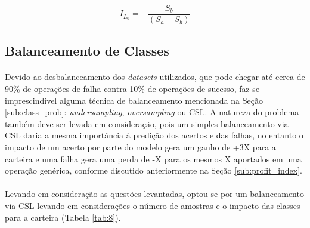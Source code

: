 \begin{equation} \label{eq:172}
    I_{L_0} = - \dfrac{S_b}{(S_a - S_b)}
\end{equation}



\FloatBarrier
\subsection{Balanceamento de Classes}

\paragraph{} Devido ao desbalanceamento dos \textit{datasets} utilizados, que pode chegar até cerca de 90\% de operações de falha contra 10\% de operações de sucesso, faz-se imprescindível alguma técnica de balanceamento mencionada na Seção \ref{sub:class_prob}: \textit{undersampling}, \textit{oversampling} ou CSL. A natureza do problema também deve ser levada em consideração, pois um simples balanceamento via CSL daria a mesma importância à predição dos acertos e das falhas, no entanto o impacto de um acerto por parte do modelo gera um ganho de +3X para a carteira e uma falha gera uma perda de -X para os mesmos X aportados em uma operação genérica, conforme discutido anteriormente na Seção \ref{sub:profit_index}.

\paragraph{} Levando em consideração as questões levantadas, optou-se por um balanceamento via CSL levando em considerações o número de amostras e o impacto das classes para a carteira (Tabela \ref{tab:8}).




